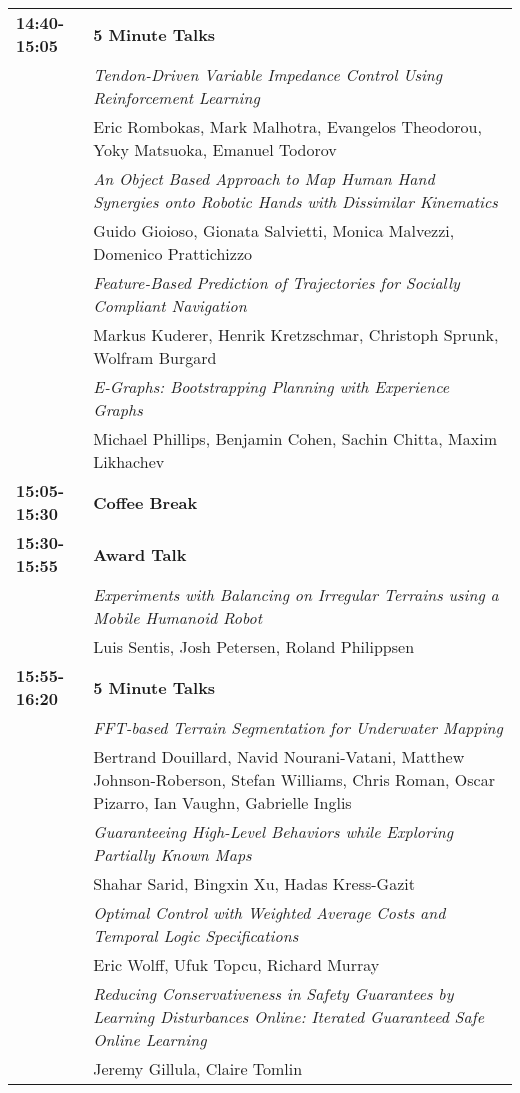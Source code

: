 \newpage
\begin{tabular}{lp{13.8cm}}
{\bf 14:40-15:05} & {\bf 5 Minute Talks} \\[2mm]
& \em{ Tendon-Driven Variable Impedance Control Using Reinforcement Learning}\\
& Eric Rombokas\label{Rombokas}, Mark Malhotra, Evangelos Theodorou, Yoky Matsuoka, Emanuel Todorov\\[2mm]
& \em{ An Object Based Approach to Map Human Hand Synergies onto Robotic Hands with Dissimilar Kinematics}\\
& Guido Gioioso\label{Gioioso}, Gionata Salvietti, Monica Malvezzi, Domenico Prattichizzo\\[2mm]
& \em{ Feature-Based Prediction of Trajectories for Socially Compliant Navigation}\\
& Markus Kuderer\label{Kuderer}, Henrik Kretzschmar, Christoph Sprunk, Wolfram Burgard\\[2mm]
& \em{ E-Graphs: Bootstrapping Planning with Experience Graphs}\\
& Michael Phillips\label{Phillips}, Benjamin Cohen, Sachin Chitta, Maxim Likhachev\\[2mm]

{\bf 15:05-15:30} & {\bf Coffee Break} \\[4mm]

{\bf 15:30-15:55} & {\bf Award Talk} \\[2mm]
& \em{ Experiments with Balancing on Irregular Terrains using a Mobile Humanoid Robot}\\
& Luis Sentis\label{Sentis}, Josh Petersen, Roland Philippsen\\[2mm]

{\bf 15:55-16:20} & {\bf 5 Minute Talks} \\[2mm]
& \em{ FFT-based Terrain Segmentation for Underwater Mapping}\\
& Bertrand Douillard\label{Douillard}, Navid Nourani-Vatani, Matthew Johnson-Roberson, Stefan Williams, Chris Roman, Oscar Pizarro, Ian Vaughn, Gabrielle Inglis\\[2mm]
& \em{ Guaranteeing High-Level Behaviors while Exploring Partially Known Maps}\\
& Shahar Sarid\label{Sarid}, Bingxin Xu, Hadas Kress-Gazit\\[2mm]
& \em{ Optimal Control with Weighted Average Costs and Temporal Logic Specifications}\\
& Eric Wolff\label{Wolff}, Ufuk Topcu, Richard Murray\\[2mm]
& \em{ Reducing Conservativeness in Safety Guarantees by Learning Disturbances Online: Iterated Guaranteed Safe Online Learning}\\
& Jeremy Gillula\label{Gillula}, Claire Tomlin\\[2mm]






\end{tabular}
